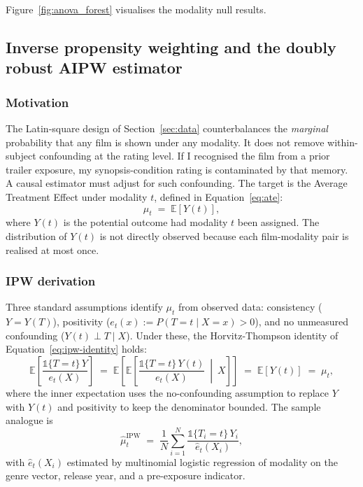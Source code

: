 \documentclass{article}
\begin{document}
Figure~\ref{fig:anova_forest} visualises the modality null results.

\subsection{Inverse propensity weighting and the doubly robust AIPW estimator}
\label{sec:ipw}

\subsubsection*{Motivation}

The Latin-square design of Section~\ref{sec:data} counterbalances the \emph{marginal} probability that any film is shown under any modality. It does not remove within-subject confounding at the rating level. If I recognised the film from a prior trailer exposure, my synopsis-condition rating is contaminated by that memory. A causal estimator must adjust for such confounding. The target is the Average Treatment Effect under modality $t$, defined in Equation~\ref{eq:ate}:
\begin{equation}
\mu_t \;=\; \mathbb{E}[Y(t)],
\label{eq:ate}
\end{equation}
where $Y(t)$ is the potential outcome had modality $t$ been assigned. The distribution of $Y(t)$ is not directly observed because each film-modality pair is realised at most once.

\subsubsection*{IPW derivation}

Three standard assumptions identify $\mu_t$ from observed data: consistency ($Y = Y(T)$), positivity ($e_t(x) := P(T = t \mid X = x) > 0$), and no unmeasured confounding ($Y(t) \perp T \mid X$). Under these, the Horvitz-Thompson identity of Equation~\ref{eq:ipw-identity} holds:
\begin{equation}
\mathbb{E}\!\left[\frac{\mathbb{1}\{T = t\}\,Y}{e_t(X)}\right] \;=\; \mathbb{E}\!\left[\mathbb{E}\!\left[\frac{\mathbb{1}\{T = t\}\,Y(t)}{e_t(X)}\ \middle|\ X\right]\right] \;=\; \mathbb{E}[Y(t)] \;=\; \mu_t,
\label{eq:ipw-identity}
\end{equation}
where the inner expectation uses the no-confounding assumption to replace $Y$ with $Y(t)$ and positivity to keep the denominator bounded. The sample analogue is
\begin{equation}
\hat\mu_t^{\mathrm{IPW}} \;=\; \frac{1}{N}\sum_{i=1}^N \frac{\mathbb{1}\{T_i = t\}\,Y_i}{\hat e_t(X_i)},
\label{eq:ipw-est}
\end{equation}
with $\hat e_t(X_i)$ estimated by multinomial logistic regression of modality on the genre vector, release year, and a pre-exposure indicator.
\end{document}
